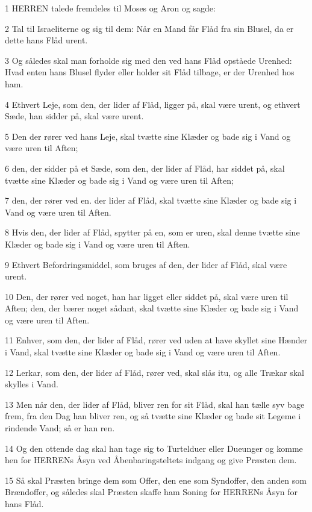 \par 1 HERREN talede fremdeles til Moses og Aron og sagde:
\par 2 Tal til Israeliterne og sig til dem: Når en Mand får Flåd fra sin Blusel, da er dette hans Flåd urent.
\par 3 Og således skal man forholde sig med den ved hans Flåd opståede Urenhed: Hvad enten hans Blusel flyder eller holder sit Flåd tilbage, er der Urenhed hos ham.
\par 4 Ethvert Leje, som den, der lider af Flåd, ligger på, skal være urent, og ethvert Sæde, han sidder på, skal være urent.
\par 5 Den der rører ved hans Leje, skal tvætte sine Klæder og bade sig i Vand og være uren til Aften;
\par 6 den, der sidder på et Sæde, som den, der lider af Flåd, har siddet på, skal tvætte sine Klæder og bade sig i Vand og være uren til Aften;
\par 7 den, der rører ved en. der lider af Flåd, skal tvætte sine Klæder og bade sig i Vand og være uren til Aften.
\par 8 Hvis den, der lider af Flåd, spytter på en, som er uren, skal denne tvætte sine Klæder og bade sig i Vand og være uren til Aften.
\par 9 Ethvert Befordringsmiddel, som bruges af den, der lider af Flåd, skal være urent.
\par 10 Den, der rører ved noget, han har ligget eller siddet på, skal være uren til Aften; den, der bærer noget sådant, skal tvætte sine Klæder og bade sig i Vand og være uren til Aften.
\par 11 Enhver, som den, der lider af Flåd, rører ved uden at have skyllet sine Hænder i Vand, skal tvætte sine Klæder og bade sig i Vand og være uren til Aften.
\par 12 Lerkar, som den, der lider af Flåd, rører ved, skal slås itu, og alle Trækar skal skylles i Vand.
\par 13 Men når den, der lider af Flåd, bliver ren for sit Flåd, skal han tælle syv bage frem, fra den Dag han bliver ren, og så tvætte sine Klæder og bade sit Legeme i rindende Vand; så er han ren.
\par 14 Og den ottende dag skal han tage sig to Turtelduer eller Dueunger og komme hen for HERRENs Åsyn ved Åbenbaringsteltets indgang og give Præsten dem.
\par 15 Så skal Præsten bringe dem som Offer, den ene som Syndoffer, den anden som Brændoffer, og således skal Præsten skaffe ham Soning for HERRENs Åsyn for hans Flåd.
